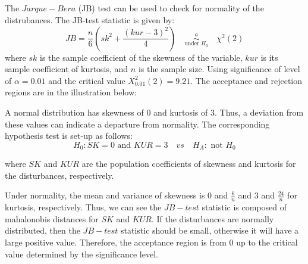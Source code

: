 \subsection{}

The $Jarque-Bera$ (JB) test can be used to check for normality of the distrubances. The JB-test statistic is given by:
$$JB = \dfrac{n}{6} \left( sk^2 + \dfrac{(kur-3)^2}{4} \right) \quad \overset{a}{\underset{\text{under }H_0}{\sim}} \quad \chi^2(2)$$
where $sk$ is the sample coefficient of the skewness of the variable, $kur$ is its sample coefficient of kurtosis, and $n$ is the sample size. Using significance of level of $\alpha = 0.01$ and the critical value $X^2_{0.01}(2) = 9.21$. The acceptance and rejection regions are in the illustration below:

\begin{center}
\end{center}

A normal distribution has skewness of 0 and kurtosis of 3.  Thus, a deviation from these values can indicate a departure from normality. The corresponding hypothesis test is set-up as follows:
$$
H_0: SK = 0 \text{ and } KUR = 3  \quad vs \quad H_A: \text{ not } H_0
$$

where $SK$ and $KUR$ are the population coefficients of skewness and kurtosis for the disturbances, respectively. 

Under normality, the mean and variance of skewness is 0 and $\frac{6}{n}$ and 3 and $\frac{24}{n}$ for kurtosis, respectively. Thus, we can see the $JB-test$ statistic is composed of mahalonobis distances for $SK$ and $KUR$. If the disturbances are normally distributed, then the $JB-test$ statistic should be small, otherwise it will have a large positive value. Therefore, the acceptance region is from 0 up to the critical value determined by the significance level.
